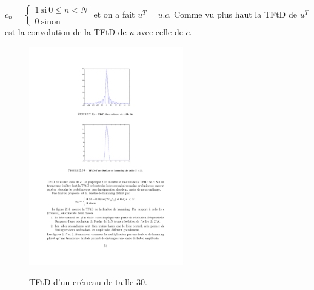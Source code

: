 \begin{definition}
$c_{n}=\left\{\begin{array}{l}
1\ \mathrm{s}\mathrm{i}\ 0\leq n<N\\
0\ \mathrm{s}\mathrm{i}\mathrm{n}\mathrm{o}\mathrm{n}
\end{array}\right.$
et on a fait $u^{T}=u.c$. Comme vu plus haut la TFtD de $u^{T}$ est la convolution de la
TFtD de $u$ avec celle de $c$.
\begin{figure}
  \centering
  \includegraphics[width=0.6\textwidth]{Figures/Figure2-15}\\
  \caption{TFtD d'un cr\'{e}neau de taille 30.}\label{fig:figure2-15}
\end{figure}


\end{definition}
